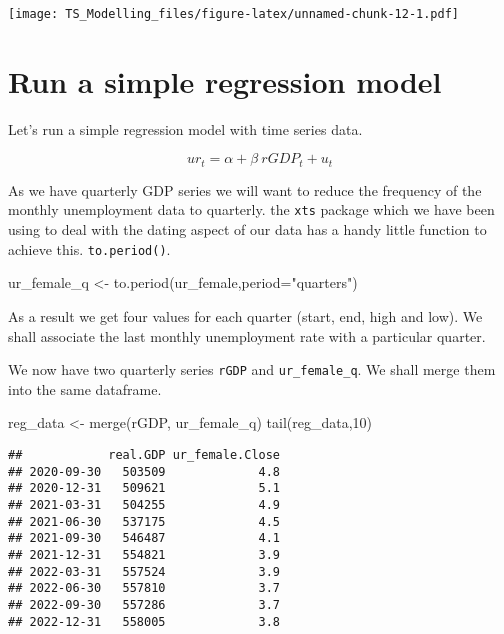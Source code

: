 \documentclass[
]{article}
\newenvironment{Shaded}{\begin{snugshade}}{\end{snugshade}}
\newcommand{\AttributeTok}[1]{\textcolor[rgb]{0.77,0.63,0.00}{#1}}
\newcommand{\DecValTok}[1]{\textcolor[rgb]{0.00,0.00,0.81}{#1}}
\newcommand{\FunctionTok}[1]{\textcolor[rgb]{0.00,0.00,0.00}{#1}}
\newcommand{\NormalTok}[1]{#1}
\newcommand{\OtherTok}[1]{\textcolor[rgb]{0.56,0.35,0.01}{#1}}
\newcommand{\SpecialCharTok}[1]{\textcolor[rgb]{0.00,0.00,0.00}{#1}}
\newcommand{\StringTok}[1]{\textcolor[rgb]{0.31,0.60,0.02}{#1}}
\begin{document}
\texttt{[image: TS\_Modelling\_files/figure-latex/unnamed-chunk-12-1.pdf]}

\hypertarget{run-a-simple-regression-model}{%
\section{Run a simple regression
model}\label{run-a-simple-regression-model}}

Let's run a simple regression model with time series data.

\[ur_t = \alpha + \beta ~ rGDP_t + u_t\]

As we have quarterly GDP series we will want to reduce the frequency of
the monthly unemployment data to quarterly. the \texttt{xts} package
which we have been using to deal with the dating aspect of our data has
a handy little function to achieve this. \texttt{to.period()}.

\begin{Shaded}
\begin{Highlighting}[]
\NormalTok{ur\_female\_q }\OtherTok{\textless{}{-}} \FunctionTok{to.period}\NormalTok{(ur\_female,}\AttributeTok{period=}\StringTok{"quarters"}\NormalTok{)}
\end{Highlighting}
\end{Shaded}

As a result we get four values for each quarter (start, end, high and
low). We shall associate the last monthly unemployment rate with a
particular quarter.

\begin{Shaded}
\end{Shaded}

We now have two quarterly series \texttt{rGDP} and
\texttt{ur\_female\_q}. We shall merge them into the same dataframe.

\begin{Shaded}
\begin{Highlighting}[]
\NormalTok{reg\_data }\OtherTok{\textless{}{-}} \FunctionTok{merge}\NormalTok{(rGDP, ur\_female\_q)}
\FunctionTok{tail}\NormalTok{(reg\_data,}\DecValTok{10}\NormalTok{)}
\end{Highlighting}
\end{Shaded}

\begin{verbatim}
##            real.GDP ur_female.Close
## 2020-09-30   503509             4.8
## 2020-12-31   509621             5.1
## 2021-03-31   504255             4.9
## 2021-06-30   537175             4.5
## 2021-09-30   546487             4.1
## 2021-12-31   554821             3.9
## 2022-03-31   557524             3.9
## 2022-06-30   557810             3.7
## 2022-09-30   557286             3.7
## 2022-12-31   558005             3.8
\end{verbatim}
\end{document}
